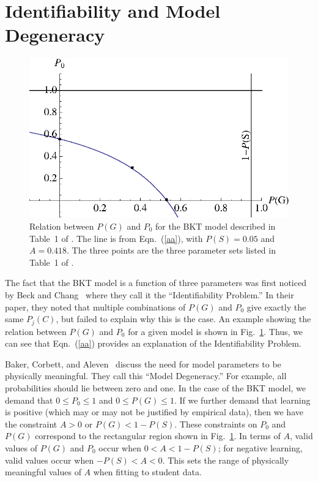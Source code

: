 \documentclass{acmlarge-edm}
\begin{document}
\section{Identifiability and Model Degeneracy}


\begin{figure}
\centering\includegraphics{table1.eps}
\caption{Relation between $P(G)$ and $P_0$ for the BKT model
  described in Table~1 of \cite{beck_identifiability:_2007}.  
  The line is from Eqn.~(\ref{aa}), with $P(S)=0.05$ and $A=0.418$.
  The three points are the  three parameter sets listed in Table~1 of
  \cite{beck_identifiability:_2007}. 
 }
 \label{table1}
\end{figure}


The fact that the BKT model is a function of three parameters
was first noticed by Beck and Chang~\cite{beck_identifiability:_2007} 
where they call it the ``Identifiability Problem.''   In their paper, 
they noted that multiple
combinations of $P(G)$ and $P_0$ give exactly the same $P_j(C)$, but
failed to explain why this is the case.  An example showing the relation
between $P(G)$ and $P_0$ for a given model is shown in Fig.~\ref{table1}.
Thus, we can see that Eqn.~(\ref{aa}) provides an explanation of the
Identifiability Problem.

Baker, Corbett, and Aleven~\cite{baker_more_2008} discuss the need for 
model parameters to be physically meaningful.  They call this 
``Model Degeneracy.''   For example, all probabilities should lie between zero and one.  
In the case of the BKT model, we demand that $0\le P_0\le 1$ and
 $0\le P(G) \le 1$.
If we further demand that learning is positive (which may or may not be justified
by empirical data), then we have the constraint $A>0$ or $P(G)<1-P(S)$.
These constraints on $P_0$ and $P(G)$ correspond to the rectangular region shown in Fig.~\ref{table1}.
In terms of $A$, valid values of $P(G)$ and $P_0$ occur when
$0<A<1-P(S)$; for negative learning, valid values occur when
$-P(S)<A<0$.  This sets the range of physically meaningful values of
$A$ when fitting to student data.
\end{document}
